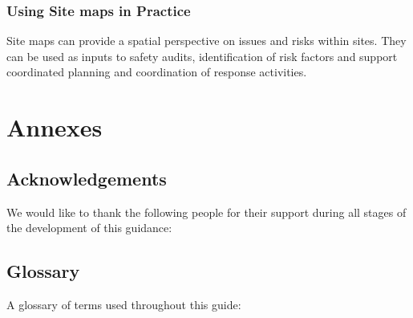 \documentclass[
  a4paper,
  onecolumn,
  oneside]{book}
\begin{document}
\hypertarget{using-site-maps-in-practice}{%
\section{Using Site maps in
Practice}\label{using-site-maps-in-practice}}

Site maps can provide a spatial perspective on issues and risks within
sites. They can be used as inputs to safety audits, identification of
risk factors and support coordinated planning and coordination of
response activities.

\part{Annexes}

\hypertarget{acknowledgements}{%
\chapter*{Acknowledgements}\label{acknowledgements}}


We would like to thank the following people for their support during all
stages of the development of this guidance:

\hypertarget{glossary}{%
\chapter*{Glossary}\label{glossary}}


A glossary of terms used throughout this guide:
\end{document}
